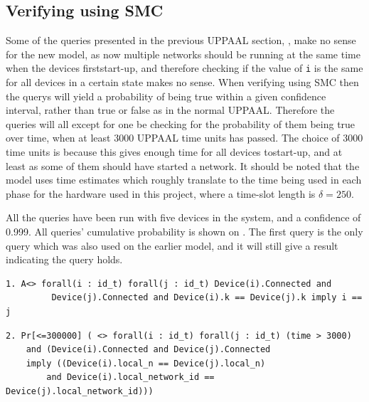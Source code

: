 
\subsection*{Verifying using SMC}

Some of the queries presented in the previous UPPAAL section, , make no sense for the new model, as now multiple networks should be running at the same time when the devices firststart-up, and therefore checking if the value of \texttt{i} is the same for all devices in a certain state makes no sense.
When verifying using SMC then the querys will yield a probability of being true within a given confidence interval, rather than true or false as in the normal UPPAAL.
Therefore the queries will all except for one be checking for the probability of them being true over time, when at least 3000 UPPAAL time units has passed.
The choice of 3000 time units is because this gives enough time for all devices tostart-up, and at least as some of them should have started a network. 
It should be noted that the model uses time estimates which roughly translate to the time being used in each phase for the hardware used in this project, where a time-slot length is $\delta = 250$.

All the queries have been run with five devices in the system, and a confidence of 0.999.
All queries' cumulative probability is shown on .
The first query is the only query which was also used on the earlier model, and it will still give a result indicating the query holds.

\begin{lstlisting}[style=UPPAAL, title={This query requires that eventually if all devices are connected, then no pair of devices have the same \texttt{k}, unless the pair consists of the same two devices. This is true.}]
1. A<> forall(i : id_t) forall(j : id_t) Device(i).Connected and
         Device(j).Connected and Device(i).k == Device(j).k imply i == j
\end{lstlisting}

\begin{lstlisting}[style=UPPAAL, title={This query asks after 3000 UPPAAL time units has passed, what then is the probability that if two devices \texttt{i}, and \texttt{j} are connected to a network that their local values of \texttt{n} are the same, and that they are both connected to the same network. This means that the devices are connected to the same network. UPPAAL runs this query and within 3451 runs [0.998,1] with confidence 99.9 \% this is true. }]
2. Pr[<=300000] ( <> forall(i : id_t) forall(j : id_t) (time > 3000) 
    and (Device(i).Connected and Device(j).Connected 
    imply ((Device(i).local_n == Device(j).local_n)
        and Device(i).local_network_id == Device(j).local_network_id)))     
\end{lstlisting}

